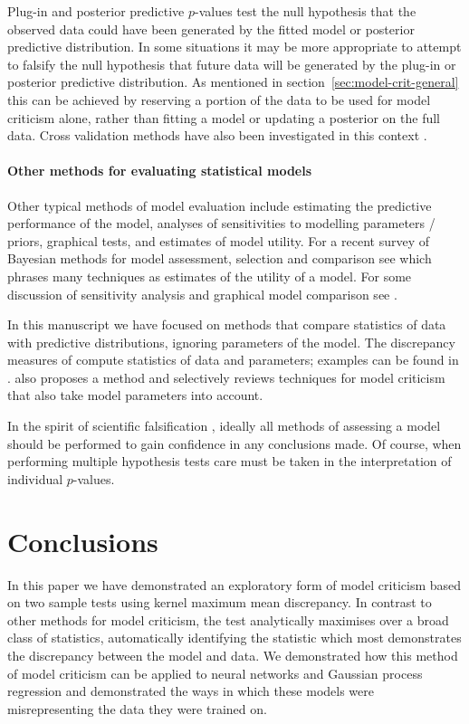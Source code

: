 Plug-in and posterior predictive $p$-values test the null hypothesis that the observed data could have been generated by the fitted model or posterior predictive distribution.
In some situations it may be more appropriate to attempt to falsify the null hypothesis that future data will be generated by the plug-in or posterior predictive distribution.
As mentioned in section~\ref{sec:model-crit-general} this can be achieved by reserving a portion of the data to be used for model criticism alone, rather than fitting a model or updating a posterior on the full data.
Cross validation methods have also been investigated in this context \citep{Gelfand1992-ow, Marshall2007-hd}.

\paragraph{Other methods for evaluating statistical models}

Other typical methods of model evaluation include estimating the predictive performance of the model, analyses of sensitivities to modelling parameters / priors, graphical tests, and estimates of model utility.
For a recent survey of Bayesian methods for model assessment, selection and comparison see \cite{Vehtari2012-oh} which phrases many techniques as estimates of the utility of a model.
For some discussion of sensitivity analysis and graphical model comparison see \eg \citet{Gelman2013-st}.

In this manuscript we have focused on methods that compare statistics of data with predictive distributions, ignoring parameters of the model.
The discrepancy measures of \cite{Gelman1996-ez} compute statistics of data and parameters; examples can be found in \cite{Gelman2013-st}.
\citet{OHagan2003-bc} also proposes a method and selectively reviews techniques for model criticism that also take model parameters into account.

In the spirit of scientific falsification \citep[e.g.][]{Popper2005-qq}, ideally all methods of assessing a model should be performed to gain confidence in any conclusions made.
Of course, when performing multiple hypothesis tests care must be taken in the interpretation of individual $p$-values.

\section{Conclusions}

In this paper we have demonstrated an exploratory form of model criticism based on two sample tests using kernel maximum mean discrepancy.
In contrast to other methods for model criticism, the test analytically maximises over a broad class of statistics, automatically identifying the statistic which most demonstrates the discrepancy between the model and data.
We demonstrated how this method of model criticism can be applied to neural networks and Gaussian process regression and demonstrated the ways in which these models were misrepresenting the data they were trained on.

